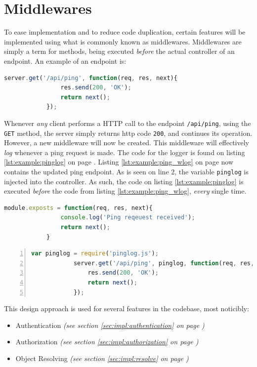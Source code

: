 	\section{Middlewares}
		\label{sec:impl:middleware}
		To ease implementation and to reduce code duplication, certain features will be implemented using what is commonly known as middlewares. Middlewares are simply a term for methods, being executed \emph{before} the actual controller of an endpoint. An example of an endpoint is:
		\begin{lstlisting}[gobble=12,language=JavaScript]
            server.get('/api/ping', function(req, res, next){
                res.send(200, 'OK');
                return next();
            });		
		\end{lstlisting}

		Whenever \emph{any} client performs a HTTP call to the endpoint \verb=/api/ping=, using the \verb=GET= method, the server simply returns http code \verb=200=, and continues its operation. However, a new middleware will now be created. This middleware will effectively \emph{log} whenever a ping request is made. The code for the logger is found on listing \ref{lst:example:pinglog} on page \pageref{lst:example:pinglog}. Listing \ref{lst:example:ping_wlog} on page \pageref{lst:example:ping_wlog} now contains the updated ping endpoint. As is seen on line 2, the variable \verb=pinglog= is injected into the controller. As such, the code on listing \ref{lst:example:pinglog} is executed \emph{before} the code from listing \ref{lst:example:ping_wlog}, \emph{every} single time.

		\begin{lstlisting}[gobble=12,language=JavaScript,caption={PingLog Middleware},label={lst:example:pinglog}]
            module.exposts = function(req, res, next){
                console.log('Ping reqeuest received');
                return next();
            }
		\end{lstlisting}

		\begin{lstlisting}[gobble=12,language=JavaScript,caption={Ping endpoint with the pinglog middleware},numbers=left,label={lst:example:ping_wlog}]
            var pinglog = require('pinglog.js');
            server.get('/api/ping', pinglog, function(req, res, next){
                res.send(200, 'OK');
                return next();
            });		
		\end{lstlisting}

		This design approach is used for several features in the codebase, most noticibly:
		\begin{itemize}
			\item Authentication \emph{(see section \ref{sec:impl:authentication} on page \pageref{sec:impl:authentication})}
			\item Authorization \emph{(see section \ref{sec:impl:authorization} on page \pageref{sec:impl:authorization})}
			\item Object Resolving \emph{(see section \ref{sec:impl:resolve} on page \pageref{sec:impl:resolve})}
		\end{itemize}

